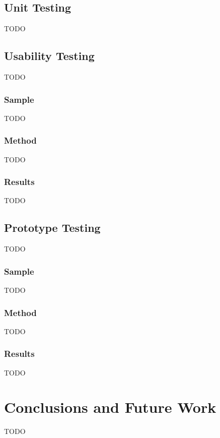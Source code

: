 \documentclass[a4paper,11pt]{article}
\begin{document}
    \vspace{0.5cm}
    \subsection{Unit Testing}
        TODO

    \vspace{0.5cm}
    \subsection{Usability Testing}
        TODO
        
    \subsubsection{Sample}
        TODO
        
    \subsubsection{Method}
        TODO
        
    \subsubsection{Results}
        TODO
        
    \subsection{Prototype Testing}
        TODO
        
    \subsubsection{Sample}
        TODO
        
    \subsubsection{Method}
        TODO
        
    \subsubsection{Results}
        TODO

    \clearpage %
    \section{Conclusions and Future Work}\label{sec:conclusionsfuturework}
        TODO
\end{document}
